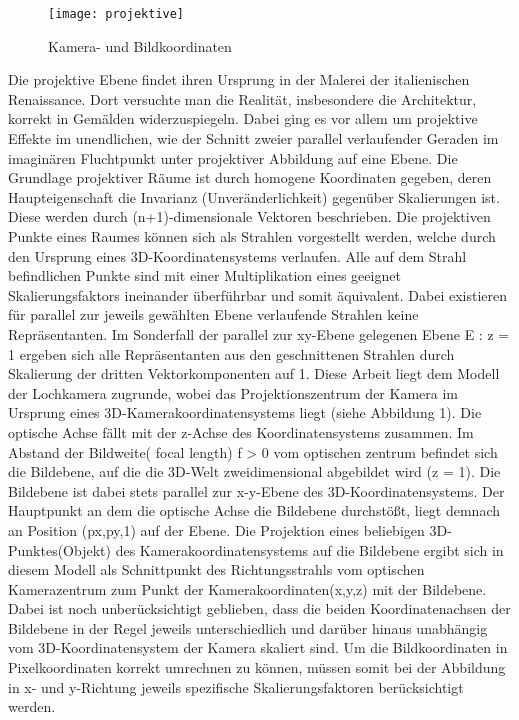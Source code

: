 \documentclass[11pt]{scrartcl}
\begin{document}
\begin{figure}[H]
  \texttt{[image: projektive]}
  \caption{Kamera- und Bildkoordinaten}
\end{figure}

\noindent
Die projektive Ebene findet ihren Ursprung in der Malerei der italienischen
Renaissance. Dort versuchte man die Realität, insbesondere die Architektur, korrekt
in Gemälden widerzuspiegeln. Dabei ging es vor allem um projektive Effekte im
unendlichen, wie der Schnitt zweier parallel verlaufender Geraden im imaginären
Fluchtpunkt unter projektiver Abbildung auf eine Ebene.
Die Grundlage projektiver Räume ist durch homogene Koordinaten gegeben, deren
Haupteigenschaft die Invarianz (Unveränderlichkeit) gegenüber Skalierungen ist.
Diese werden durch (n+1)-dimensionale Vektoren beschrieben. Die projektiven
Punkte eines Raumes können sich als Strahlen vorgestellt werden, welche durch
den Ursprung eines 3D-Koordinatensystems verlaufen. Alle auf dem Strahl
befindlichen Punkte sind mit einer Multiplikation eines geeignet Skalierungsfaktors
ineinander überführbar und somit äquivalent. Dabei existieren für parallel zur jeweils
gewählten Ebene verlaufende Strahlen keine Repräsentanten. Im Sonderfall der
parallel zur xy-Ebene gelegenen Ebene E : z = 1 ergeben sich alle Repräsentanten
aus den geschnittenen Strahlen durch Skalierung der dritten Vektorkomponenten auf
1.
Diese Arbeit liegt dem Modell der Lochkamera zugrunde, wobei das
Projektionszentrum der Kamera im Ursprung eines 3D-Kamerakoordinatensystems
liegt (siehe Abbildung 1). Die optische Achse fällt mit der z-Achse des
Koordinatensystems zusammen. Im Abstand der Bildweite( focal length) f > 0 vom
optischen zentrum befindet sich die Bildebene, auf die die 3D-Welt zweidimensional
abgebildet wird (z = 1). Die Bildebene ist dabei stets parallel zur x-y-Ebene des
3D-Koordinatensystems. Der Hauptpunkt an dem die optische Achse die Bildebene
durchstößt, liegt demnach an Position (px,py,1) auf der Ebene. Die Projektion eines
beliebigen 3D-Punktes(Objekt) des Kamerakoordinatensystems auf die Bildebene
ergibt sich in diesem Modell als Schnittpunkt des Richtungsstrahls vom optischen
Kamerazentrum zum Punkt der Kamerakoordinaten(x,y,z) mit der Bildebene. Dabei
ist noch unberücksichtigt geblieben, dass die beiden Koordinatenachsen der
Bildebene in der Regel jeweils unterschiedlich und darüber hinaus unabhängig vom
3D-Koordinatensystem der Kamera skaliert sind. Um die Bildkoordinaten in
Pixelkoordinaten korrekt umrechnen zu können, müssen somit bei der Abbildung in
x- und y-Richtung jeweils spezifische Skalierungsfaktoren berücksichtigt werden.
\end{document}

